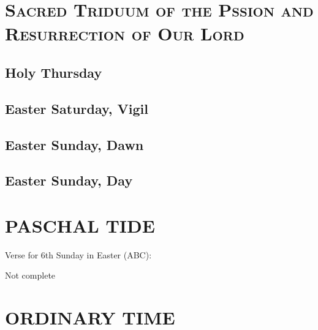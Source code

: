 \documentclass[11pt]{book} %
\begin{document}


\chapter{\textsc{Sacred Triduum of the Pssion and Resurrection of Our Lord}}

\section{Holy Thursday}
\section{Easter Saturday, Vigil}
\section{Easter Sunday, Dawn}
\section{Easter Sunday, Day}


\chapter{PASCHAL TIDE}



\begin{paragraph}\noindent\begin{large}
Verse for 6th Sunday in Easter (ABC):
\end{large}\newline\end{paragraph}

\begin{paragraph}\noindent
Not complete\newline
\end{paragraph}


\chapter{ORDINARY TIME}

\end{document}
